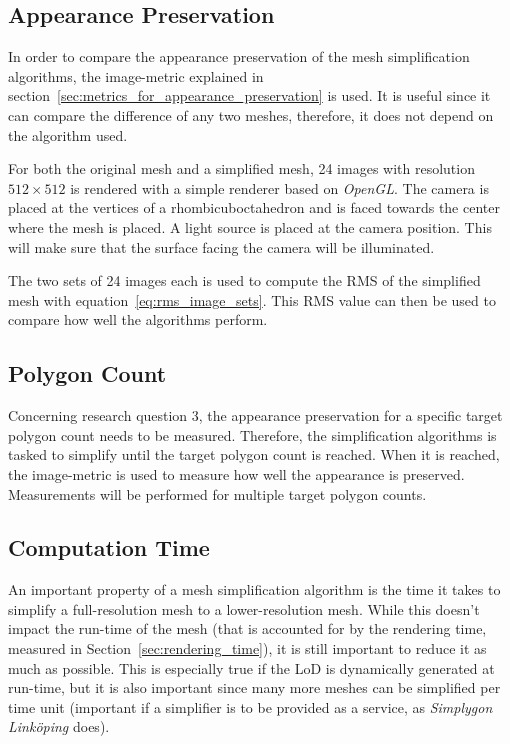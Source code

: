         \subsection{Appearance Preservation} \label{sec:appearance_preservation}
        In order to compare the appearance preservation of the mesh simplification algorithms, the image-metric explained in section~\ref{sec:metrics_for_appearance_preservation} is used. It is useful since it can compare the difference of any two meshes, therefore, it does not depend on the algorithm used.

        For both the original mesh and a simplified mesh, 24 images with resolution $512 \times 512$ is rendered with a simple renderer based on \emph{OpenGL}. The camera is placed at the vertices of a rhombicuboctahedron and is faced towards the center where the mesh is placed. A light source is placed at the camera position. This will make sure that the surface facing the camera will be illuminated.

        The two sets of 24 images each is used to compute the RMS of the simplified mesh with equation~\ref{eq:rms_image_sets}. This RMS value can then be used to compare how well the algorithms perform. 
        \subsection{Polygon Count} \label{sec:polygon_count}
        Concerning research question 3, the appearance preservation for a specific target polygon count needs to be measured. Therefore, the simplification algorithms is tasked to simplify until the target polygon count is reached. When it is reached, the image-metric is used to measure how well the appearance is preserved. Measurements will be performed for multiple target polygon counts. 

        \subsection{Computation Time} \label{sec:computation_time}

        An important property of a mesh simplification algorithm is the time it takes to simplify a full-resolution mesh to a lower-resolution mesh. While this doesn't impact the run-time of the mesh (that is accounted for by the rendering time, measured in Section~\ref{sec:rendering_time}), it is still important to reduce it as much as possible. This is especially true if the LoD is dynamically generated at run-time, but it is also important since many more meshes can be simplified per time unit (important if a simplifier is to be provided as a service, as \emph{Simplygon Linköping} does).

